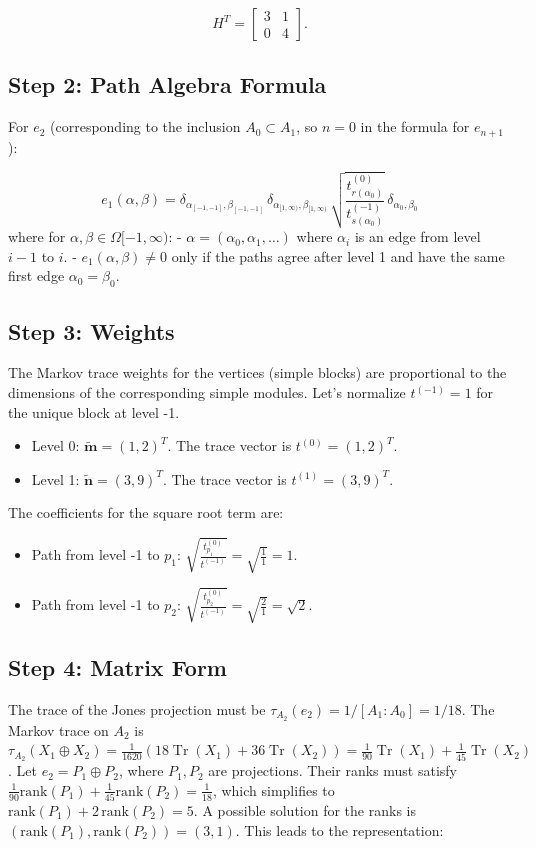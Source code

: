 \documentclass[11pt]{article}
\theoremstyle{mytheoremstyle}
\theoremstyle{definition}
\theoremstyle{remark}
\DeclareMathOperator{\Tr}{Tr}
\newcommand{\dimvec}[1]{\widetilde{\bm #1}} %
\begin{document}
\[
H^T = \begin{bmatrix} 3 & 1 \\ 0 & 4 \end{bmatrix}.
\]
\medskip

\subsection*{Step 2: Path Algebra Formula}
For \( e_2 \) (corresponding to the inclusion $A_0 \subset A_1$, so $n=0$ in the formula for $e_{n+1}$):

\[
e_{1}(\alpha, \beta) = \delta_{\alpha_{[-1,-1]}, \beta_{[-1,-1]}} \, \delta_{\alpha_{[1, \infty)}, \beta_{[1, \infty)}} \, \sqrt{ \frac{t^{(0)}_{r(\alpha_0)}}{t^{(-1)}_{s(\alpha_0)}} } \, \delta_{\alpha_{0}, \beta_{0}}
\]
where for \( \alpha, \beta \in \Omega[-1, \infty) \):
- \( \alpha = (\alpha_0, \alpha_1, \dots) \) where \( \alpha_i \) is an edge from level $i-1$ to $i$.
- \( e_1(\alpha, \beta) \neq 0 \) only if the paths agree after level 1 and have the same first edge $\alpha_0=\beta_0$.
\medskip

\subsection*{Step 3: Weights}
The Markov trace weights for the vertices (simple blocks) are proportional to the dimensions of the corresponding simple modules. Let's normalize $t^{(-1)}=1$ for the unique block at level -1.
\begin{itemize}
    \item Level 0: \( \dimvec{m} = (1, 2)^T \). The trace vector is \( t^{(0)} = (1, 2)^T \).
    \item Level 1: \( \dimvec{n} = (3, 9)^T \). The trace vector is \( t^{(1)} = (3, 9)^T \).
\end{itemize}
The coefficients for the square root term are:
\begin{itemize}
    \item Path from level -1 to $p_1$: \( \sqrt{ \frac{t^{(0)}_{p_1}}{t^{(-1)}} } = \sqrt{ \frac{1}{1} } = 1 \).
    \item Path from level -1 to $p_2$: \( \sqrt{ \frac{t^{(0)}_{p_2}}{t^{(-1)}} } = \sqrt{ \frac{2}{1} } = \sqrt{2} \).
\end{itemize}
\medskip

\subsection*{Step 4: Matrix Form}
The trace of the Jones projection must be \( \tau_{A_2}(e_2) = 1/[A_1:A_0] = 1/18 \). The Markov trace on $A_2$ is \( \tau_{A_2}(X_1 \oplus X_2) = \frac{1}{1620}(18\Tr(X_1) + 36\Tr(X_2)) = \frac{1}{90}\Tr(X_1) + \frac{1}{45}\Tr(X_2) \). Let \( e_2 = P_1 \oplus P_2 \), where $P_1, P_2$ are projections. Their ranks must satisfy \( \frac{1}{90}\mathrm{rank}(P_1) + \frac{1}{45}\mathrm{rank}(P_2) = \frac{1}{18} \), which simplifies to \( \mathrm{rank}(P_1) + 2\,\mathrm{rank}(P_2) = 5 \).
A possible solution for the ranks is \( (\mathrm{rank}(P_1), \mathrm{rank}(P_2)) = (3, 1) \). This leads to the representation:
\end{document}
